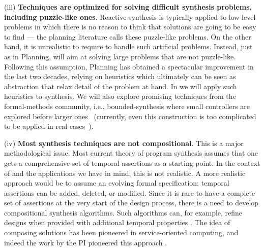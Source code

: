 (iii) \textbf{Techniques are optimized for solving difficult synthesis
problems, including puzzle-like ones}.
Reactive synthesis is typically applied to low-level problems in which
there is no reason to think that solutions are going to be easy to
find --- the planning literature calls these puzzle-like problems.  On
the other hand, it is unrealistic to require \project to handle such
artificial problems.  Instead, just as in Planning, \project will aim
at solving large problems that are not puzzle-like.  Following this
assumption, Planning has obtained a spectacular improvement in the
last two decades, relying on heuristics which ultimately can be seen
as abstraction that relax detail of the problem at hand. In \project
we will apply such heuristics to synthesis.  We will also explore
promising techniques from the formal-methods community, i.e.,
bounded-synthesis where small controllers are explored before larger
ones~\cite{FinkbeinerS13,FiliotJR11,FaymonvilleFRT17} (currently, even
this construction is too complicated to be applied in real
cases~\cite{JacobsBBK0KKLNP16}).  {\color{red}{Are you sure?}}

% 


(iv)  \textbf{Most synthesis techniques are not compositional}.
  This is a major methodological issue. Most current theory of program
  synthesis assumes that one gets a comprehensive set of temporal
  assertions as a starting point. In the context of \project and the
  applications we have in mind, this is not realistic.  A more
  realistic approach would be to assume an evolving formal
  specification: temporal assertions can be added, deleted, or
  modified. Since it is rare to have a complete set of assertions at
  the very start of the design process, there is a need to develop
  compositional synthesis algorithms. Such algorithms can, for
  example, refine designs when provided with additional temporal
  properties \cite{KupfermanPV06,FiliotJR11,AlurMT16}.
  {\color{red}{Are these the right citations?}} The idea of composing
  solutions has been pioneered in service-oriented computing, and
  indeed the work by the PI pioneered this approach
  \cite{BerardiCGLM03,DeGiacomoFPS10,DePS13,CalvaneseGLV16}.

